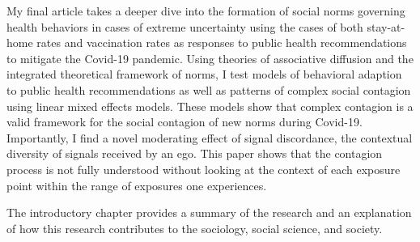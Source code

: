 My final article takes a deeper dive into the formation of social norms
governing health behaviors in cases of extreme uncertainty using the cases of
both stay-at-home rates and vaccination rates as responses to public health recommendations to mitigate the Covid-19 pandemic. Using theories of associative diffusion and the integrated
theoretical framework of norms, I test models of behavioral adaption to public health
recommendations as well as patterns of complex social contagion using linear
mixed effects models. These models show that complex contagion is a valid 
framework for the social contagion of new norms during Covid-19. Importantly, I find
a novel moderating effect of signal discordance, the contextual diversity of
signals received by an ego. This paper shows that the contagion process is not
fully understood without looking at the context of each exposure point within the
range of exposures one experiences. 

The introductory chapter provides a summary of the research and an explanation of how this
research contributes to the sociology, social science, and society.
